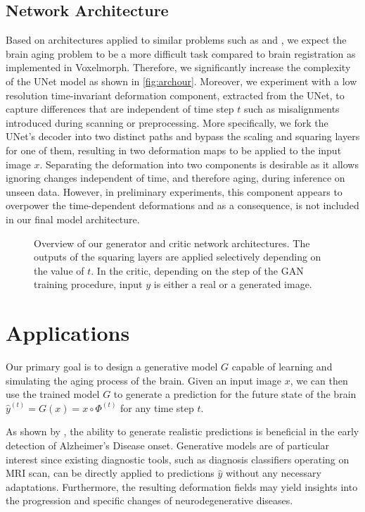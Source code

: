 \subsection{Network Architecture}
Based on architectures applied to similar problems such as \cite{wegmayr2019generative} and \cite{baumgartner2018visual}, we expect the brain aging problem to be a more difficult task compared to brain registration as implemented in Voxelmorph. Therefore, we significantly increase the complexity of the UNet model as shown in \autoref{fig:archour}.
Moreover, we experiment with a low resolution time-invariant deformation component, extracted from the UNet, to capture differences that are independent of time step $t$ such as misalignments introduced during scanning or preprocessing. More specifically, we fork the UNet's decoder into two distinct paths and bypass the scaling and squaring layers for one of them, resulting in two deformation maps to be applied to the input image $x$. Separating the deformation into two components is desirable as it allows ignoring changes independent of time, and therefore aging, during inference on unseen data.
However, in preliminary experiments, this component appears to overpower the time-dependent deformations and as a consequence, is not included in our final model architecture.

\begin{figure}
	\centering
	
	\caption{Overview of our generator and critic network architectures. The outputs of the squaring layers are applied selectively depending on the value of $t$. In the critic, depending on the step of the GAN training procedure, input $y$ is either a real or a generated image.}
	\label{fig:archour}
\end{figure}

\section{Applications}
Our primary goal is to design a generative model $G$ capable of learning and simulating the aging process of the brain. Given an input image $x$, we can then use the trained model $G$ to generate a prediction for the future state of the brain $\hat y^{(t)} = G(x) = x \circ \Phi^{(t)}$ for any time step $t$.

As shown by \cite{wegmayr2019generative}, the ability to generate realistic predictions is beneficial in the early detection of Alzheimer's Disease onset. Generative models are of particular interest since existing diagnostic tools, such as diagnosis classifiers operating on MRI scan, can be directly applied to predictions $\hat y$ without any necessary adaptations. Furthermore, the resulting deformation fields may yield insights into the progression and specific changes of neurodegenerative diseases.

